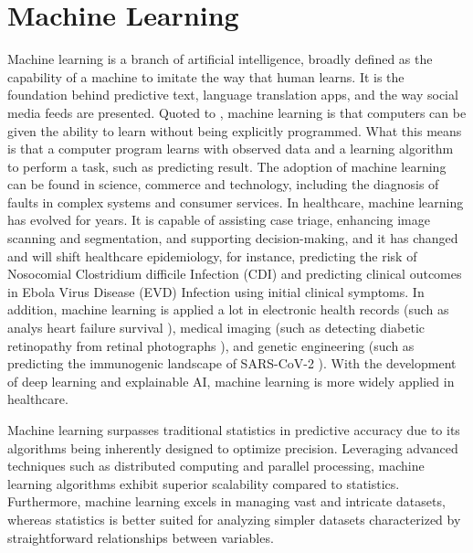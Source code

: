 \documentclass[12pt,a4paper,english
]{tunithesis}
\begin{document}
\section{Machine Learning}
Machine learning is a branch of artificial intelligence, broadly defined as the capability of a machine to imitate the way that human learns. It is the foundation behind predictive text, language translation apps, and the way social media feeds are presented. \parencite{sara2021} Quoted to \textcite{samuel1959}, machine learning is that computers can be given the ability to learn without being explicitly programmed. What this means is that a computer program learns with observed data and a learning algorithm to perform a task, such as predicting result. %
The adoption of machine learning can be found in science, commerce and technology, including the diagnosis of faults in complex systems and consumer services. \parencite{jorden2015} In healthcare, machine learning has evolved for years. It is capable of assisting case triage, enhancing image scanning and segmentation, and supporting decision-making, and it has changed and will shift healthcare epidemiology, for instance, predicting the risk of Nosocomial Clostridium difficile Infection (CDI) and predicting clinical outcomes in Ebola Virus Disease (EVD) Infection using initial clinical symptoms. \parencite{Jenna2017, Habehh2021} In addition, machine learning is applied a lot in electronic health records (such as analys heart failure survival \parencite{Panahiazar2015}), medical imaging (such as detecting diabetic retinopathy from retinal photographs \parencite{Gulshan2016}), and genetic engineering (such as predicting the immunogenic landscape of SARS-CoV-2 \parencite{Malone2020} ). With the development of deep learning and explainable AI, machine learning is more widely applied in healthcare.

Machine learning surpasses traditional statistics in predictive accuracy due to its algorithms being inherently designed to optimize precision. Leveraging advanced techniques such as distributed computing and parallel processing, machine learning algorithms exhibit superior scalability compared to statistics. Furthermore, machine learning excels in managing vast and intricate datasets, whereas statistics is better suited for analyzing simpler datasets characterized by straightforward relationships between variables.  \parencite{Bzdok2018, Rajula2020}
\end{document}
